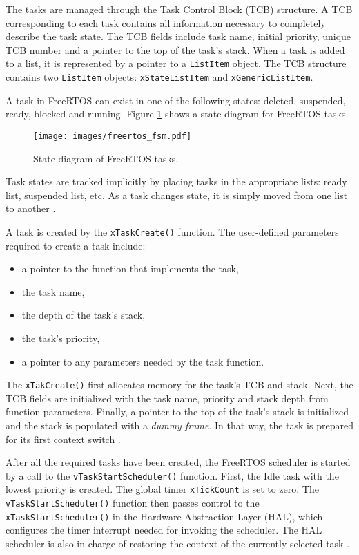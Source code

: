 The tasks are managed through the Task Control Block (TCB) structure. 
A TCB corresponding to each task contains all information necessary to completely describe the task state. 
The TCB fields include task name, initial priority, unique TCB number and a pointer to the top of the task's stack. 
When a task is added to a list, it is represented by a pointer to a \verb$ListItem$ object. 
The TCB structure contains two \verb$ListItem$ objects: \verb$xStateListItem$ and \verb$xGenericListItem$.

A task in FreeRTOS can exist in one of the following states: deleted, suspended, ready, blocked and running. 
Figure \ref{freertos:state} shows a state diagram for FreeRTOS tasks. 

\begin{figure}[ht]
    \centering
    \texttt{[image: images/freertos\_fsm.pdf]}
    \caption{State diagram of FreeRTOS tasks.}
    \label{freertos:state}
\end{figure}

Task states are tracked implicitly by placing tasks in the appropriate lists: ready list, suspended list, etc. As a task changes state, it is simply moved from one list to another 
\cite{brown2012architecture}.

A task is created by the \verb$xTaskCreate()$ function. 
The user-defined parameters required to create a task include: 
\begin{itemize}
	\item a pointer to the function that implements the task,
	\item the task name,
	\item the depth of the task's stack,
	\item the task's priority,
	\item a pointer to any parameters needed by the task function.
\end{itemize}
The \verb$xTakCreate()$ first allocates memory for the task's TCB and stack.
Next, the TCB fields are initialized with the task name, priority and stack depth from function parameters. 
Finally, a pointer to the top of the task's stack is initialized and the stack is populated with a \textit{dummy frame}. 
In that way, the task is prepared for its first context switch \cite{goyette2007analysis}.

After all the required tasks have been created, the FreeRTOS scheduler is started by a call to the 
\verb$vTaskStartScheduler()$ function. 
First, the Idle task with the lowest priority is created.
The global timer \verb$xTickCount$ is set to zero. 
The \verb$vTaskStartScheduler()$ function then passes control to the \verb$xTaskStartScheduler()$ in the Hardware Abstraction Layer (HAL), which configures the timer interrupt needed for invoking the scheduler. 
The HAL scheduler is also in charge of restoring the context of the currently selected task
\cite{goyette2007analysis}. 

